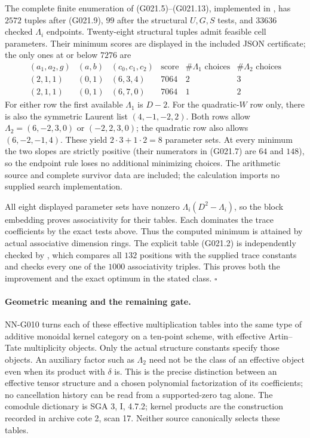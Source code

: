The complete finite enumeration of (G021.5)--(G021.13),
implemented in ,
has $2572$ tuples after (G021.9), $99$ after the structural
$U,G,S$ tests, and $33636$ checked $\Lambda_i$ endpoints.
Twenty-eight structural tuples admit feasible cell parameters.
Their minimum scores are displayed in the included JSON
certificate; the only ones at or below $7276$ are
\[
 \begin{array}{c|c|c|c|c|c}
 (a_1,a_2,g)&(a,b)&(c_0,c_1,c_2)&\text{score}
       &\#\Lambda_1\text{ choices}&\#\Lambda_2\text{ choices}\\\hline
 (2,1,1)&(0,1)&(6,3,4)&7064&2&3\\
 (2,1,1)&(0,1)&(6,7,0)&7064&1&2
 \end{array}                                           \tag{G021.14}
\]
For either row the first available $\Lambda_1$ is $D-2$.
For the quadratic-$W$ row only, there is also the symmetric
Laurent list $(4,-1,-2,2)$. Both rows allow
$\Lambda_2=(6,-2,3,0)$ or $(-2,2,3,0)$; the quadratic row
also allows $(6,-2,-1,4)$. These yield $2\cdot3+1\cdot2=8$
parameter sets. At every minimum the two slopes are strictly
positive (their numerators in (G021.7) are $64$ and $148$),
so the endpoint rule loses no additional minimizing choices.
The arithmetic source and complete survivor data are included;
the calculation imports no supplied search implementation.

All eight displayed parameter sets have nonzero
$\Lambda_i(D^2-\Lambda_i)$, so the block embedding proves
associativity for their tables. Each dominates the trace
coefficients by the exact tests above. Thus the computed
minimum is attained by actual associative dimension rings.
The explicit table (G021.2) is independently checked by
, which compares all $132$
positions with the supplied trace constants and checks every
one of the $1000$ associativity triples. This proves both
the improvement and the exact optimum in the stated class.
\hfill$\square$

\paragraph{Geometric meaning and the remaining gate.}
NN-G010 turns each of these effective multiplication tables
into the same type of additive monoidal kernel category on
a ten-point scheme, with effective Artin--Tate multiplicity
objects. Only the actual structure constants specify those
objects. An auxiliary factor such as $\Lambda_2$ need not
be the class of an effective object even when its product
with $\delta$ is. This is the precise distinction between
an effective tensor structure and a chosen polynomial
factorization of its coefficients; no cancellation history
can be read from a supported-zero tag alone.
The comodule dictionary is SGA 3, I, 4.7.2; kernel products
are the construction recorded in archive cote 2, scan 17.
Neither source canonically selects these tables.

